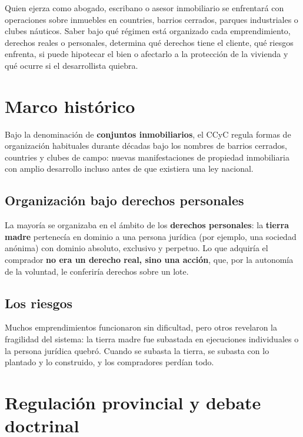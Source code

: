 \documentclass[12pt,oneside]{book}
\begin{document}
Quien ejerza como abogado, escribano o asesor inmobiliario se enfrentará con operaciones sobre inmuebles en countries, barrios cerrados, parques industriales o clubes náuticos. Saber bajo qué régimen está organizado cada emprendimiento, derechos reales o personales, determina qué derechos tiene el cliente, qué riesgos enfrenta, si puede hipotecar el bien o afectarlo a la protección de la vivienda y qué ocurre si el desarrollista quiebra.

\section{Marco histórico}

Bajo la denominación de \textbf{conjuntos inmobiliarios}, el CCyC regula formas de organización habituales durante décadas bajo los nombres de barrios cerrados, countries y clubes de campo: nuevas manifestaciones de propiedad inmobiliaria con amplio desarrollo incluso antes de que existiera una ley nacional.

\subsection{Organización bajo derechos personales}

La mayoría se organizaba en el ámbito de los \textbf{derechos personales}: la \textbf{tierra madre} pertenecía en dominio a una persona jurídica (por ejemplo, una sociedad anónima) con dominio absoluto, exclusivo y perpetuo. Lo que adquiría el comprador \textbf{no era un derecho real, sino una acción}, que, por la autonomía de la voluntad, le conferiría derechos sobre un lote.

\subsection{Los riesgos}

Muchos emprendimientos funcionaron sin dificultad, pero otros revelaron la fragilidad del sistema: la tierra madre fue subastada en ejecuciones individuales o la persona jurídica quebró. Cuando se subasta la tierra, se subasta con lo plantado y lo construido, y los compradores perdían todo.

\section{Regulación provincial y debate doctrinal}
\end{document}
